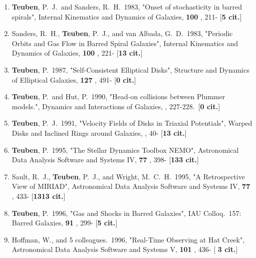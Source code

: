 \documentclass[11pt,letterpaper]{article}
\begin{document}
\begin{enumerate}[resume,label=\textbf{\arabic*}.]


\item  
{\bf Teuben}, P.~J.~and Sanders, R.~H.\  1983,  "Onset of stochasticity in 
barred spirals", Internal Kinematics and Dynamics of Galaxies,  {\bf 100} , 
211- [{\bf 5 cit.}] 

\item  
Sanders, R.~H., {\bf Teuben}, P.~J., and van Albada, G.~D.\  1983,  "Periodic 
Orbits and Gas Flow in Barred Spiral Galaxies", Internal Kinematics and 
Dynamics of Galaxies,  {\bf 100} , 221- [{\bf 13 cit.}] 

\item  
{\bf Teuben}, P.\  1987,  "Self-Consistent Elliptical Disks", Structure and 
Dynamics of Elliptical Galaxies,  {\bf 127} , 491- [{\bf 0 cit.}] 


\item  
{\bf Teuben}, P.~and Hut, P.\  1990,  "Head-on collisions between Plummer 
models.", Dynamics and Interactions of Galaxies,  , 227-228.\  [{\bf 0 
cit.}] 

\item  
{\bf Teuben}, P.~J.\  1991,  "Velocity Fields of Disks in Triaxial Potentials", 
Warped Disks and Inclined Rings around Galaxies,  , 40- [{\bf 13 cit.}] 





\item  
{\bf Teuben}, P.\  1995,  "The Stellar Dynamics Toolbox NEMO", Astronomical Data 
Analysis Software and Systems IV,  {\bf 77} , 398- [{\bf 133 cit.}] 

\item  
Sault, R.~J., {\bf Teuben}, P.~J., and Wright, M.~C.~H.\  1995,  "A 
Retrospective View of MIRIAD", Astronomical Data Analysis Software and 
Systems IV,  {\bf 77} , 433- [{\bf 1313 cit.}] 

\item  
{\bf Teuben}, P.\  1996,  "Gas and Shocks in Barred Galaxies", IAU Colloq.~157: 
Barred Galaxies,  {\bf 91} , 299- [{\bf 5 cit.}] 

\item  
Hoffman, W., and 5 colleagues.\  1996,  "Real-Time Observing at Hat Creek", 
Astronomical Data Analysis Software and Systems V,  {\bf 101} , 436- [{\bf 
3 cit.}] 





\end{enumerate}
\end{document}
